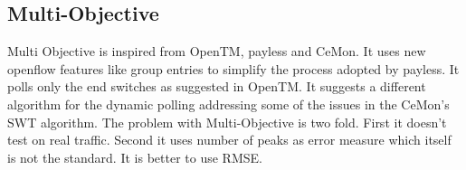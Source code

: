 \subsection{Multi-Objective}
Multi Objective is inspired from OpenTM\cite{opentm}, payless\cite{payless} and CeMon\cite{CEMON}. It uses new openflow features like group entries to simplify the process adopted by payless. It polls only the end switches as suggested in OpenTM. It suggests a different algorithm for the dynamic polling addressing some of the issues in the CeMon's SWT algorithm. The problem with Multi-Objective is two fold. First it doesn't test on real traffic. Second it uses number of peaks as error measure which itself is not the standard. It is better to use RMSE. 